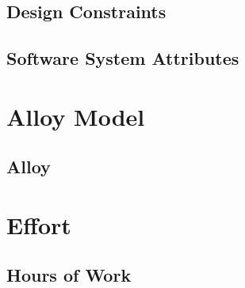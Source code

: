 \documentclass[12pt, a4paper]{report}
\begin{document}
\section{Design Constraints}


\section{Software System Attributes}


\chapter{Alloy Model}
\label{ch:alloy}

\section{Alloy}


\chapter{Effort}
\label{ch:effort}

\section{Hours of Work}



%

%
\end{document}
